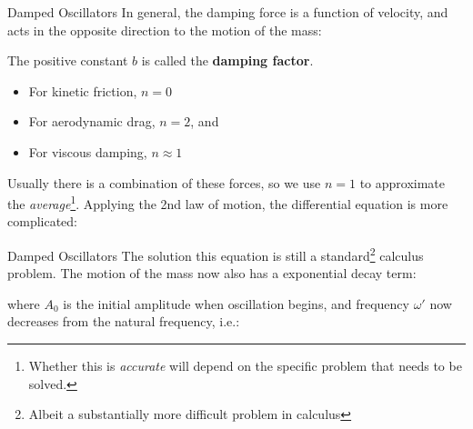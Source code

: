 \documentclass[12pt,compress,aspectratio=169]{beamer}
\begin{document}
\begin{frame}{Damped Oscillators}
  In general, the damping force is a function of velocity, and acts in the
  opposite direction to the motion of the mass:
  

  \vspace{-.15in}The positive constant $b$ is called the \textbf{damping
    factor}.
  \begin{itemize}
  \item For kinetic friction, $n=0$
  \item For aerodynamic drag, $n=2$, and
  \item For viscous damping, $n\approx 1$
  \end{itemize}
  Usually there is a combination of these forces, so we use $n=1$ to
  approximate the \emph{average}\footnote{Whether this is
  \emph{accurate} will depend on the specific problem that needs to be solved.}.
  Applying the 2nd law of motion, the differential equation is more complicated:
  
\end{frame}



\begin{frame}{Damped Oscillators}
  The solution this equation is still a standard\footnote{Albeit a
  substantially more difficult problem in calculus} calculus problem. The
  motion of the mass now also has a {\color{magenta}exponential decay} term:


  where $A_0$ is the initial amplitude when oscillation begins,
  and frequency $\omega'$ now decreases from the natural frequency, i.e.:



\end{frame}
\end{document}

